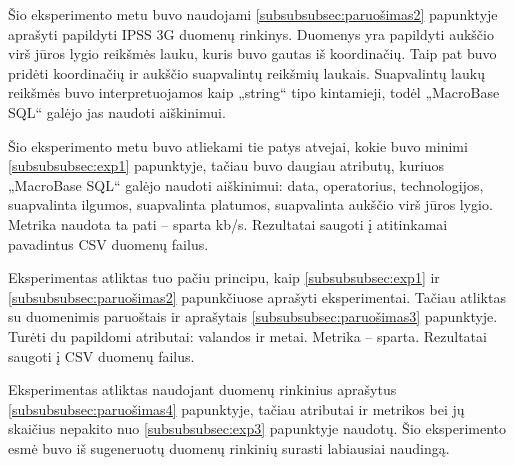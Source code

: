\documentclass{VUMIFPSbakalaurinis}
\begin{document}
 \label{subsubsubsec:exp2}
Šio eksperimento metu buvo naudojami \ref{subsubsubsec:paruošimas2} papunktyje aprašyti papildyti IPSS 3G duomenų rinkinys. Duomenys yra papildyti aukščio virš jūros lygio reikšmės lauku, kuris buvo gautas iš koordinačių. Taip pat buvo pridėti koordinačių ir aukščio suapvalintų reikšmių laukais. Suapvalintų laukų reikšmės buvo interpretuojamos kaip „string“ tipo kintamieji, todėl „MacroBase SQL“ galėjo jas naudoti aiškinimui.\par

Šio eksperimento metu buvo atliekami tie patys atvejai, kokie buvo minimi \ref{subsubsubsec:exp1} papunktyje, tačiau buvo daugiau atributų, kuriuos „MacroBase SQL“ galėjo naudoti aiškinimui: data, operatorius, technologijos, suapvalinta ilgumos, suapvalinta platumos, suapvalinta aukščio virš jūros lygio. Metrika naudota ta pati – sparta kb/s. Rezultatai saugoti į atitinkamai pavadintus CSV duomenų failus.

 \label{subsubsubsec:exp3}
Eksperimentas atliktas tuo pačiu principu, kaip \ref{subsubsubsec:exp1} ir \ref{subsubsubsec:paruošimas2} papunkčiuose aprašyti eksperimentai. Tačiau atliktas su duomenimis paruoštais ir aprašytais \ref{subsubsubsec:paruošimas3} papunktyje. Turėti du papildomi atributai: valandos ir metai. Metrika – sparta. Rezultatai saugoti į CSV duomenų failus.

 \label{subsubsubsec:exp4}
Eksperimentas atliktas naudojant duomenų rinkinius aprašytus \ref{subsubsubsec:paruošimas4} papunktyje, tačiau atributai ir metrikos bei jų skaičius nepakito nuo \ref{subsubsubsec:exp3} papunktyje naudotų. Šio eksperimento esmė buvo iš sugeneruotų duomenų rinkinių surasti labiausiai naudingą.\par
\end{document}
